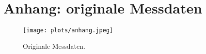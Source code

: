 \newpage
\section*{Anhang: originale Messdaten}
\label{sec:Anhang}
\begin{figure}
    \centering
    \texttt{[image: plots/anhang.jpeg]}
    \caption{Originale Messdaten.}
    \label{fig:orig}
\end{figure}